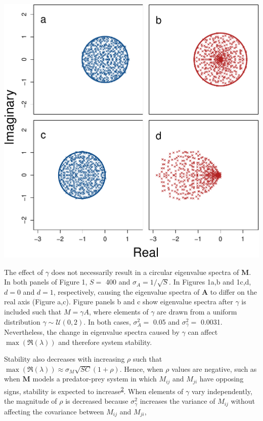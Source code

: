 \documentclass[]{article}
\begin{document}
\includegraphics{revision_notes_files/figure-latex/unnamed-chunk-2-1.pdf}

The effect of \(\gamma\) does not necessarily result in a circular
eigenvalue spectra of \(\textbf{M}\). In both panels of Figure 1,
\(S =\) 400 and \(\sigma_{A} = 1/\sqrt{S}\). In Figures 1a,b and 1c,d,
\(d = 0\) and \(d = 1\), respectively, causing the eigenvalue spectra of
\(\textbf{A}\) to differ on the real axis (Figure a,c). Figure panels b
and c show eigenvalue spectra after \(\gamma\) is included such that
\(M = \gamma A\), where elements of \(\gamma\) are drawn from a uniform
distribution \(\gamma \sim \mathcal{U}(0, 2)\). In both cases,
\(\sigma^{2}_{A} =\) 0.05 and \(\sigma^{2}_{\gamma} =\) 0.0031.
Nevertheless, the change in eigenvalue spectra caused by \(\gamma\) can
affect \(\max(\Re(\lambda))\) and therefore system stability.

Stability also decreases with increasing \(\rho\) such that
\(\max(\Re(\lambda)) \approx \sigma_{M}\sqrt{SC}\left(1 + \rho\right)\).
Hence, when \(\rho\) values are negative, such as when \(\textbf{M}\)
models a predator-prey system in which \(M_{ij}\) and \(M_{ji}\) have
opposing signs, stability is expected to
increase\textsuperscript{\protect\hyperlink{ref-Allesina2012}{2}}. When
elements of \(\gamma\) vary independently, the magnitude of \(\rho\) is
decreased because \(\sigma^{2}_{\gamma}\) increases the variance of
\(M_{ij}\) without affecting the covariance between \(M_{ij}\) and
\(M_{ji}\),
\end{document}
